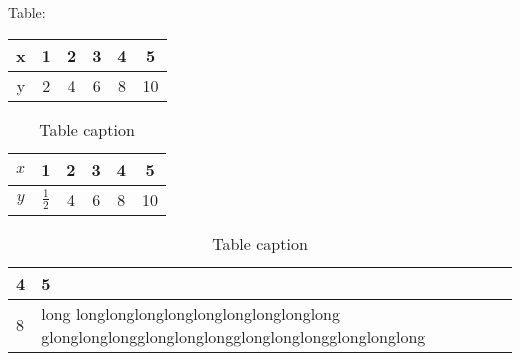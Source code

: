 \documentclass[12pt,a4paper]{article}
\begin{document}
Table:

\begin{tabular}{|cccccc|}
x & 1 & 2 & 3 & 4 & 5 \\
\hline
y & 2 & 4 & 6 & 8 & 10 \\
\end{tabular}

\begin{table}[H]
\centering
\def\arraystretch{1.5} %
\begin{tabular}{|cccccc|}
$x$ & 1 & 2 & 3 & 4 & 5 \\
\hline
$y$ & $\frac{1}{2}$ & 4 & 6 & 8 & 10 \\
\hline
\end{tabular}
\caption{Table caption}
\end{table}

\begin{table}[H]
  \centering
  \def\arraystretch{1.5} %
  \begin{tabular}{|lp{10cm}|}
  \hline 
  4 & 5 \\
  \hline
  8 & long longlonglonglonglonglonglonglonglong  glonglonglongglonglonglongglonglonglongglonglonglong\\
  \hline
  \end{tabular}
  \caption{Table caption}
  \end{table}
\end{document}
